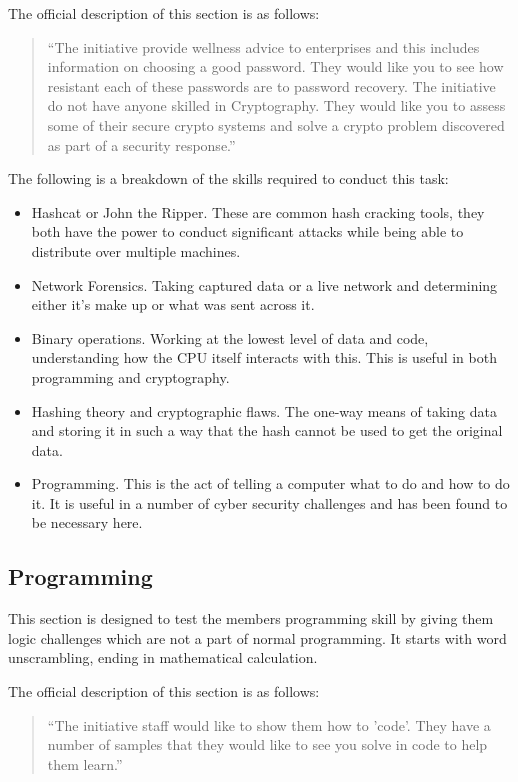 \documentclass[a4paper,11pt]{report}
\begin{document}
			The official description of this section is as follows:
			\begin{quote}
				``The initiative provide wellness advice to enterprises and this includes information on choosing a good password. They would like you to see how resistant each of these passwords are to password recovery. The initiative do not have anyone skilled in Cryptography. They would like you to assess some of their secure crypto systems and solve a crypto problem discovered as part of a security response.''
			\end{quote}

			The following is a breakdown of the skills required to conduct this task:
			\begin{itemize}
				\item Hashcat or John the Ripper. 
					These are common hash cracking tools, they both have the power to conduct significant attacks while being able to distribute over multiple machines. 
				\item Network Forensics.
					Taking captured data or a live network and determining either it's make up or what was sent across it. 
				\item Binary operations. 
					Working at the lowest level of data and code, understanding how the CPU itself interacts with this. 
					This is useful in both programming and cryptography. 
				\item Hashing theory and cryptographic flaws.
					The one-way means of taking data and storing it in such a way that the hash cannot be used to get the original data. 
				\item Programming.
					This is the act of telling a computer what to do and how to do it. 
					It is useful in a number of cyber security challenges and has been found to be necessary here. 
			\end{itemize}

		\subsection{Programming}
			This section is designed to test the members programming skill by giving them logic challenges which are not a part of normal programming. 
			It starts with word unscrambling, ending in mathematical calculation. 
			
			The official description of this section is as follows:
			\begin{quote}
				``The initiative staff would like to show them how to 'code'. They have a number of samples that they would like to see you solve in code to help them learn.''
			\end{quote}
\end{document}
